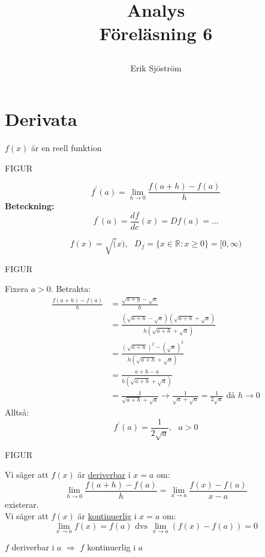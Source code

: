 

\title{
     Analys\\
     Föreläsning 6
    \author{Erik Sjöström}
}

\maketitle

\section{Derivata} %
\label{sec:derivata}
$f(x)$ är en reell funktion
\begin{center}
    FIGUR   
\end{center}
\[
f^\prime(a) = \lim\limits_{h \to 0}\frac{f(a + h) - f(a)}{h}
\]
\textbf{Beteckning:} 
\[
f^\prime(a) = \frac{df}{dc}(x) = Df(a) = ...
\]
\begin{Ex}
    \[
    f(x) = \sqrt(x), \mbox{ } D_f = \{x \in \mathbb{R}: x \ge 0\} = [0, \infty)
    \]
    \begin{center}
        FIGUR
    \end{center}
    Fixera $a > 0$. Betrakta:
    \begin{align*}
        \frac{f(a+h) - f(a)}{h} &= \frac{\sqrt{a + g} - \sqrt{a}}{h}\\
        &= \frac{(\sqrt{a+h} - \sqrt{a})(\sqrt{a+h} + \sqrt{a})}{h(\sqrt{a+h} + \sqrt{a})} \\
        &= \frac{(\sqrt{a+h})^2 - (\sqrt{a})^2}{h(\sqrt{a+h} + \sqrt{a})}\\
        &= \frac{a + h - a}{h(\sqrt{a+h} + \sqrt{a})} \\
        &= \frac{1}{\sqrt{a+h} + \sqrt{a}}
        \to \frac{1}{\sqrt{a} + \sqrt{a}}
        =\frac{1}{2\sqrt{a}} \mbox{ då } h \to 0
    \end{align*}
    Alltså:
    \[
    f^\prime(a) = \frac{1}{2\sqrt{a}}, \mbox{ } a > 0
    \]
    \begin{center}
        FIGUR
    \end{center}
\end{Ex}
Vi säger att $f(x)$ är \underline{deriverbar} i $x = a$ om:
\[
\lim\limits_{h \to 0}\frac{f(a+h) - f(a)}{h} = \lim\limits_{x \to a}\frac{f(x)- f(a)}{x-a}
\]
existerar.\\
Vi säger att $f(x)$ är \underline{kontinuerlig} i $x = a$ om:
\[
\lim\limits_{x \to a}f(x) = f(a) \mbox{ dvs } \lim\limits_{x \to a}(f(x) - f(a)) = 0
\]
\begin{sats}
    $f$ deriverbar i $a$ $\Rightarrow$ $f$ kontinuerlig i $a$
\end{sats}
